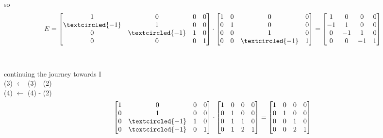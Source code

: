 \documentclass[a4paper,11pt]{article}
\begin{document}
\\\\
so 
\begin{align}
E = 
\begin{bmatrix} 
    1 & 0 & 0 & 0\\
    \textcircled{-1} & 1 & 0 & 0\\
    0 & \textcircled{-1} & 1 & 0\\
    0 & 0 & 0 & 1\\  
\end{bmatrix}
\cdot
\begin{bmatrix} 
    1 & 0 & 0 & 0\\
    0 & 1 & 0 & 0\\
    0 & 0 & 1 & 0\\
    0 & 0 & \textcircled{-1} & 1\\ 
\end{bmatrix}
=
\begin{bmatrix} 
    1 & 0 & 0 & 0\\
    -1 & 1 & 0 & 0\\
    0 & -1 & 1 & 0\\
    0 & 0 & -1 & 1\\ 
\end{bmatrix}
\end{align}
\\\\
continuing the journey towards I \\
(3) $\leftarrow$ (3) - (2)\\
(4) $\leftarrow$ (4) - (2)\\
\begin{align}
\begin{bmatrix} 
    1 & 0 & 0 & 0\\
    0 & 1 & 0 & 0\\
    0 & \textcircled{-1} & 1 & 0\\
    0 & \textcircled{-1} & 0 & 1\\ 
\end{bmatrix}
\cdot
\begin{bmatrix} 
    1 & 0 & 0 & 0\\
    0 & 1 & 0 & 0\\
    0 & 1 & 1 & 0\\
    0 & 1 & 2 & 1\\ 
\end{bmatrix}
=
\begin{bmatrix} 
    1 & 0 & 0 & 0\\
    0 & 1 & 0 & 0\\
    0 & 0 & 1 & 0\\
    0 & 0 & 2 & 1\\ 
\end{bmatrix}
\end{align}
\end{document}
